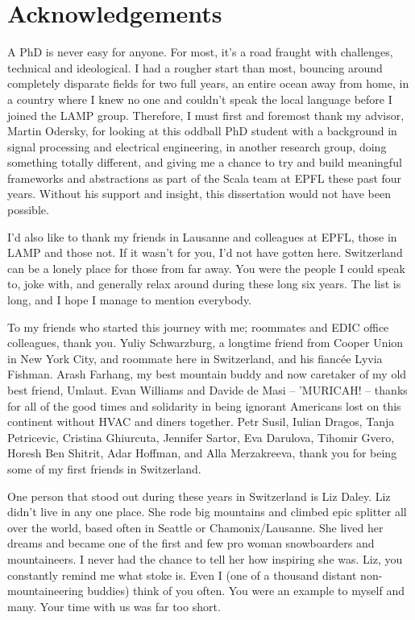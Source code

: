 \chapter*{Acknowledgements}

\vspace{0.5cm}
A PhD is never easy for anyone. For most, it's a road fraught with challenges,
technical and ideological. I had a rougher start than most, bouncing around
completely disparate fields for two full years, an entire ocean away from home,
in a country where I knew no one and couldn't speak the local language before I
joined the LAMP group. Therefore, I must first and foremost thank my advisor,
Martin Odersky, for looking at this oddball PhD student with a background in
signal processing and electrical engineering, in another research group, doing
something totally different, and giving me a chance to try and build meaningful
frameworks and abstractions as part of the Scala team at EPFL these past four
years. Without his support and insight, this dissertation would not have been
possible.

\vspace{0.5cm}
I'd also like to thank my friends in Lausanne and colleagues at EPFL, those in
LAMP and those not. If it wasn't for you, I'd not have gotten here. Switzerland
can be a lonely place for those from far away. You were the people I could speak
to, joke with, and generally relax around during these long six years. The list
is long, and I hope I manage to mention everybody.

\vspace{0.5cm}
To my friends who started this journey with me; roommates and EDIC office
colleagues, thank you. Yuliy Schwarzburg, a longtime friend from Cooper Union in
New York City, and roommate here in Switzerland, and his fianc\'{e}e Lyvia
Fishman. Arash Farhang, my best mountain buddy and now caretaker of my old best
friend, Umlaut. Evan Williams and Davide de Masi -- 'MURICAH! -- thanks for all
of the good times and solidarity in being ignorant Americans lost on this
continent without HVAC and diners together. Petr Susil, Iulian Dragos, Tanja
Petricevic, Cristina Ghiurcuta, Jennifer Sartor, Eva Darulova, Tihomir Gvero,
Horesh Ben Shitrit, Adar Hoffman, and Alla Merzakreeva, thank you for being some
of my first friends in Switzerland.

\vspace{0.5cm}
One person that stood out during these years in Switzerland is Liz Daley. Liz
didn't live in any one place. She rode big mountains and climbed epic splitter
all over the world, based often in Seattle or Chamonix/Lausanne. She lived her
dreams and became one of the first and few pro woman snowboarders and
mountaineers. I never had the chance to tell her how inspiring she was. Liz, you
constantly remind me what stoke is. Even I (one of a thousand distant
non-mountaineering buddies) think of you often. You were an example to myself
and many. Your time with us was far too short.

